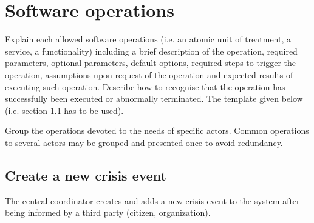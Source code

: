 \chapter{Software operations}
\label{chap:soptware_operations}


Explain each allowed software operations (i.e. an atomic unit of treatment, a service, a functionality) including a brief description of the operation, required parameters, optional parameters, default options, required steps to trigger the operation, assumptions upon request of the operation and expected results of executing such operation.
Describe how to recognise that the operation has successfully been executed or
abnormally terminated. The template given below (i.e. section \ref{operation:MyOperation} has to be used).

Group the operations devoted to the needs of specific actors. Common
operations to several actors may be grouped and presented once to avoid redundancy.


\section{Create a new crisis event}
\label{operation:MyOperation}
The central coordinator creates and adds a new crisis event to the system after
being informed by a third party (citizen, organization).

